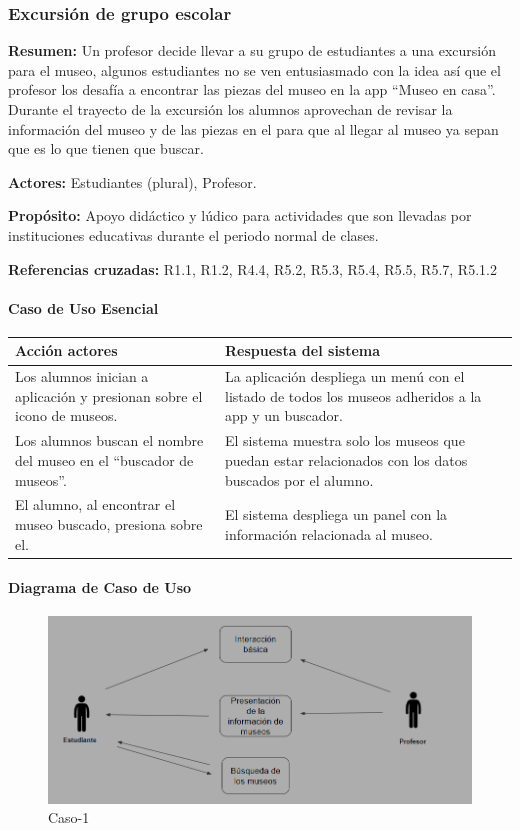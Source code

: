 \subsubsection{Excursión de grupo escolar}

{\textbf {Resumen:}}
Un profesor decide llevar a su grupo de estudiantes a una excursión para el museo, algunos estudiantes no se ven entusiasmado con la idea así que el profesor los desafía a encontrar las piezas del museo en la app “Museo en casa”. Durante el trayecto de la excursión los alumnos aprovechan de revisar la información del museo y de las piezas en el para que al llegar al museo ya sepan que es lo que tienen que buscar.

{\textbf {Actores:}}
Estudiantes (plural), Profesor.

{\textbf {Propósito:}}
Apoyo didáctico y lúdico para actividades que son llevadas por instituciones educativas durante el periodo normal de clases.

{\textbf {Referencias cruzadas:}}
R1.1, R1.2, R4.4, R5.2, R5.3, R5.4, R5.5, R5.7, R5.1.2

\paragraph{Caso de Uso Esencial}

\begin{longtable}{|p{5cm}|p{8cm}|}
\hline 
Acción actores & Respuesta del sistema \\ 
\hline 
Los alumnos inician a aplicación y presionan sobre el icono de museos. & La aplicación despliega un menú con el listado de todos los museos adheridos a la app y un buscador. \\ 
\hline 
Los alumnos buscan el nombre del museo en el “buscador de museos”. & El sistema muestra solo los museos que puedan estar relacionados con los datos buscados por el alumno. \\ 
\hline 
El alumno, al encontrar el museo buscado, presiona sobre el. & El sistema despliega un panel con la información relacionada al museo. \\ 
\hline 
\end{longtable}

\paragraph{Diagrama de Caso de Uso}

\begin{figure}[H]
\centerline{\includegraphics[width=15cm]{imgs/CasoUso_5.PNG}}
\caption{Caso-1}
\label{fig}
\end{figure}

